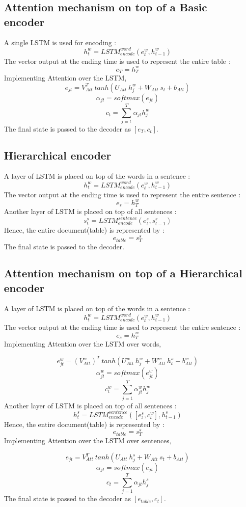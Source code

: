 \documentclass[12pt]{report}
\begin{document}
\subsection{Attention mechanism on top of a Basic encoder}
A single LSTM is used for encoding : 
\[
h^w_t = LSTM_{encode}^{word}(e^w_t, h^w_{t-1})
\]
The vector output at the ending time is used to represent the entire table : 
\[
e_T = h^w_{T}
\]
Implementing Attention over the LSTM,
$$e_{jt} = V_{Att}^T \ tanh(U_{Att} \ h^w_j + W_{Att} \ s_t + b_{Att}) $$
$$\alpha_{jt} = softmax(e_{jt})$$
$$c_t = \sum_{j=1}^T \alpha_{jt} h^w_j$$
The final state is passed to the decoder as $[e_T, c_t]$.

\subsection{Hierarchical encoder}
A layer of LSTM is placed on top of the words in a sentence :
\[
h^w_t = LSTM_{encode}^{word}(e^w_t, h^w_{t-1})
\]
The vector output at the ending time is used to represent the entire sentence : 
\[
e_s = h^w_{T}
\]
Another layer of LSTM is placed on top of all sentences :
\[
s^s_t = LSTM_{encode}^{sentence}(e^s_t, s^s_{t-1})
\]
Hence, the entire document(table) is represented by :
\[
e_{table} = s^s_T
\]
The final state is passed to the decoder.

\subsection{Attention mechanism on top of a Hierarchical encoder}
A layer of LSTM is placed on top of the words in a sentence :
\[
h^w_t = LSTM_{encode}^{word}(e^w_t, h^w_{t-1})
\]
The vector output at the ending time is used to represent the entire sentence : 
\[
e_s = h^w_{T}
\]
Implementing Attention over the LSTM over words,

$$e^w_{jt} = (V^w_{Att})^T \ tanh(U^w_{Att} \ h^w_j + W^w_{Att} \ h^s_t + b^w_{Att}) $$
$$\alpha^w_{jt} = softmax(e^w_{jt})$$
$$c^w_t = \sum_{j=1}^T \alpha^w_{jt} h^w_j$$
Another layer of LSTM is placed on top of all sentences :
\[
h^s_t=LSTM_{encode}^{sentence}([e^s_t,c^w_t], h^s_{t-1})
\]
Hence, the entire document(table) is represented by :
\[
e_{table} = s^s_T
\]
Implementing Attention over the LSTM over sentences,

$$e_{jt} = V_{Att}^T \ tanh(U_{Att} \ h^s_j + W_{Att} \ s_t + b_{Att}) $$
$$\alpha_{jt} = softmax(e_{jt})$$
$$c_t = \sum_{j=1}^T \alpha_{jt} h^s_j$$
The final state is passed to the decoder as $[e_{table}, c_t]$.
\end{document}

